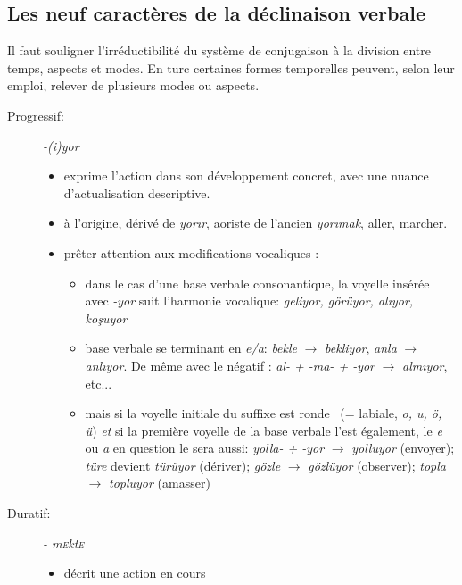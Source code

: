 \documentclass{cours}
\newcommand{\ch}{\c{s}}
\newcommand{\sce}{\textsc{e}}
\begin{document}
\subsection{Les neuf caractères de la déclinaison verbale}
Il faut souligner l'irréductibilité du système de conjugaison à la division entre temps, aspects et modes. En turc certaines formes temporelles peuvent, selon leur emploi, relever de plusieurs modes ou aspects.

\begin{description}
    \item[Progressif:] {\sl -(i)yor}
          \begin{itemize}
              \item exprime l'action dans son développement concret, avec une nuance d'actualisation descriptive.
              \item à l'origine, dérivé de \textsl{yor\i r}, aoriste de l'ancien \textsl{yor\i mak}, \og aller, marcher\fg.
              \item prêter attention aux modifications vocaliques :
                    \begin{itemize}[label = \textbullet]
                        \item dans le cas d'une base verbale consonantique, la voyelle insérée avec \textsl{-yor} suit l'harmonie vocalique: \textsl{geliyor, görüyor, al\i yor, ko\ch uyor}
                        \item base verbale se terminant en \textsl{e/a}: \textsl{bekle} $\to$ \textsl{bekliyor}, \textsl{anla} $\to$ \textsl{anl\i yor}. De même avec le négatif : \textsl{al- + -ma- + -yor} $\to$ \textsl{alm\i yor}, etc...
                        \item mais si la voyelle initiale du suffixe est \og ronde \fg\ (= labiale, \textsl{o, u, ö, ü}) \emph{et} si la première voyelle de la base verbale l'est également, le \textsl{e} ou {\sl a} en question le sera aussi: \textsl{yolla- + -yor} $\to$ \textsl{yolluyor} (envoyer); \textsl{türe} devient \textsl{türüyor} (dériver); \textsl{gözle} $\to$ \textsl{gözlüyor} (observer); \textsl{topla} $\to$ \textsl{topluyor} (amasser)
                    \end{itemize}
          \end{itemize}
    \item [Duratif:] {\sl - m\sce kt\sce}
          \begin{itemize}
              \item décrit une action en cours
          \end{itemize}

\end{description}
\end{document}
